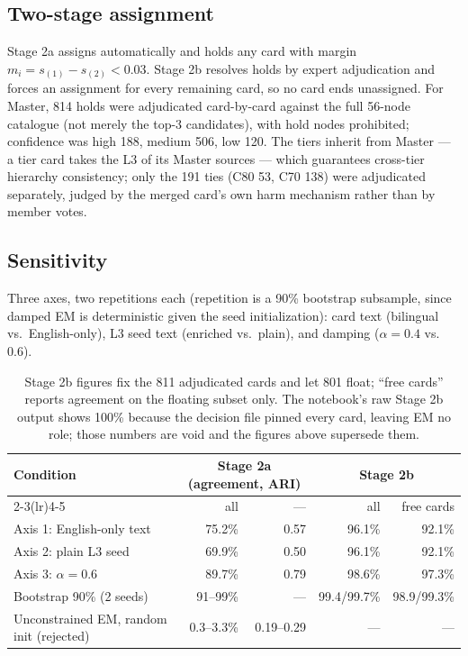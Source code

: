 \documentclass[11pt,a4paper]{article}
\begin{document}
\subsection{Two-stage assignment}

Stage 2a assigns automatically and holds any card with margin $m_i = s_{(1)}-s_{(2)} < 0.03$. Stage 2b resolves holds by expert adjudication and forces an assignment for every remaining card, so no card ends unassigned. For Master, 814 holds were adjudicated card-by-card against the full 56-node catalogue (not merely the top-3 candidates), with hold nodes prohibited; confidence was high 188, medium 506, low 120. The tiers inherit from Master --- a tier card takes the L3 of its Master sources --- which guarantees cross-tier hierarchy consistency; only the 191 ties (C80 53, C70 138) were adjudicated separately, judged by the merged card's own harm mechanism rather than by member votes.

\subsection{Sensitivity}

Three axes, two repetitions each (repetition is a 90\% bootstrap subsample, since damped EM is deterministic given the seed initialization): card text (bilingual vs.\ English-only), L3 seed text (enriched vs.\ plain), and damping ($\alpha=0.4$ vs.\ $0.6$).

\begin{table}[h]
\centering\small
\begin{tabular}{@{}lrrrr@{}}
\toprule
Condition & \multicolumn{2}{c}{Stage 2a (agreement, ARI)} & \multicolumn{2}{c}{Stage 2b} \\
\cmidrule(lr){2-3}\cmidrule(lr){4-5}
 & all & --- & all & free cards \\
\midrule
Axis 1: English-only text & 75.2\% & 0.57 & 96.1\% & 92.1\% \\
Axis 2: plain L3 seed     & 69.9\% & 0.50 & 96.1\% & 92.1\% \\
Axis 3: $\alpha=0.6$      & 89.7\% & 0.79 & 98.6\% & 97.3\% \\
Bootstrap 90\% (2 seeds)  & 91--99\% & --- & 99.4/99.7\% & 98.9/99.3\% \\
\midrule
Unconstrained EM, random init (rejected) & 0.3--3.3\% & 0.19--0.29 & --- & --- \\
\bottomrule
\end{tabular}
\caption{Stage 2b figures fix the 811 adjudicated cards and let 801 float; ``free cards'' reports agreement on the floating subset only. The notebook's raw Stage 2b output shows 100\% because the decision file pinned every card, leaving EM no role; those numbers are void and the figures above supersede them.}
\end{table}
\end{document}
